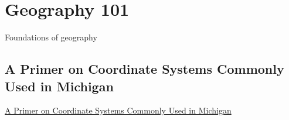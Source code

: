 \documentclass[class=report , crop=false, openany, titlepage, twoside, multi={itemize, figure, verbatim}, float=false]{standalone}
\title{}  %
\begin{document}

\section{Geography 101}

Foundations of geography

\subsection[Coordinate Systems for Michigan]{A Primer on Coordinate Systems Commonly Used in Michigan}

\href{../../../documentation/references/geo101/MiCoordinateSystems.pdf}{A Primer on Coordinate Systems Commonly Used in Michigan}
\end{document}
